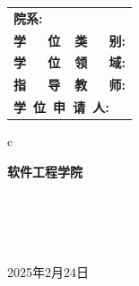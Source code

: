 \vskip 1.0cm

\begin{center}
	\renewcommand\arraystretch{1.5}
	\begin{tabular}{l}
		{\sihao \bf 院\qquad\qquad 系:} \\
		{\sihao \bf 学~~~位~~类~~~别:}      \\
		{\sihao \bf 学~~~位~~领~~~域:}      \\
		{\sihao \bf 指~~~导~~教~~~师:}      \\
		{\sihao \bf 学~位~申~请~人:}
	\end{tabular}
	\begin{tabular}c

		{\sihao \bf  \qquad 软件工程学院 \qquad} \\
		                  \\
		                 \\
		                     \\
		                     \\


		\hline
	\end{tabular}
\end{center}

\vskip 2.0cm

\begin{center}
	{\sihao 2025年2月24日}
\end{center}

\cleardoublepage